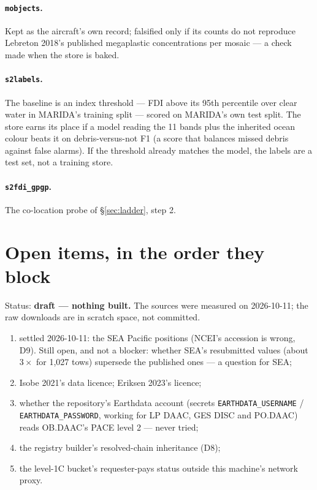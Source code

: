 \documentclass[10pt]{article}
\newcommand{\code}[1]{\texttt{#1}}
\begin{document}
\paragraph{\code{mobjects}.} Kept as the aircraft's own record; falsified only if its counts do not reproduce
Lebreton 2018's published megaplastic concentrations per mosaic --- a check made when the store is baked.

\paragraph{\code{s2labels}.} The baseline is an index threshold --- FDI above its 95th percentile over clear water
in MARIDA's training split --- scored on MARIDA's own test split. The store earns its place if a model reading the
11 bands plus the inherited ocean colour beats it on debris-versus-not F1 (a score that balances missed debris
against false alarms). If the threshold already matches the model, the labels are a test set, not a training store.

\paragraph{\code{s2fdi\_gpgp}.} The co-location probe of \S\ref{sec:ladder}, step 2.

\section{Open items, in the order they block}

Status: \textbf{draft --- nothing built.} The sources were measured on 2026-10-11; the raw downloads are in
scratch space, not committed.
\begin{enumerate}\itemsep2pt
\item settled 2026-10-11: the SEA Pacific positions (NCEI's accession is wrong, D9). Still open, and not a blocker: whether SEA's resubmitted values (about $3\times$ for 1,027 tows) supersede the published ones --- a question for SEA;
\item Isobe 2021's data licence; Eriksen 2023's licence;
\item whether the repository's Earthdata account (secrets \code{EARTHDATA\_USERNAME} / \code{EARTHDATA\_PASSWORD},
working for LP DAAC, GES DISC and PO.DAAC) reads OB.DAAC's PACE level 2 --- never tried;
\item the registry builder's resolved-chain inheritance (D8);
\item the level-1C bucket's requester-pays status outside this machine's network proxy.
\end{enumerate}
\end{document}
